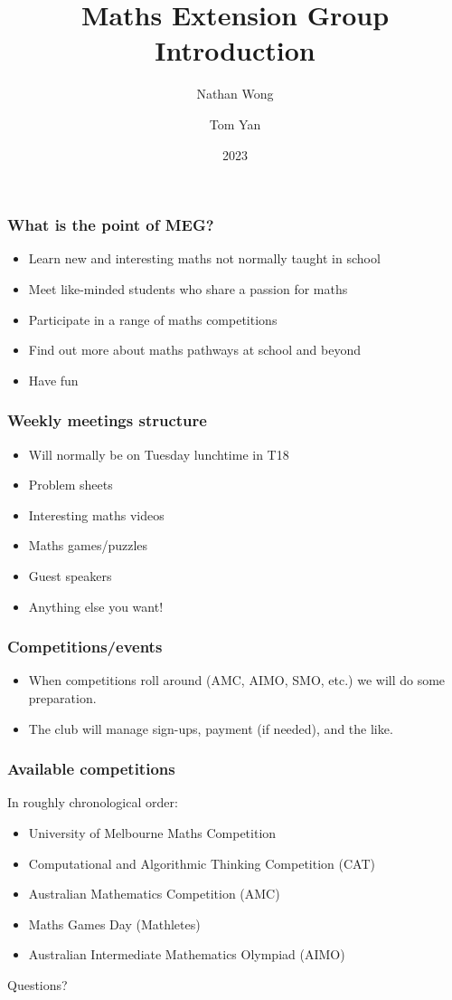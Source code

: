 \documentclass{beamer}
\title{Maths Extension Group Introduction}
\author{Nathan Wong \and Tom Yan}
\institute{Melbourne High School}
\date{2023}
\begin{document}
\frame{\titlepage}

\begin{frame}
  \frametitle{What is the point of MEG?}
  \pause
  \begin{itemize}
  \item Learn new and interesting maths not normally taught in school\pause
  \item Meet like-minded students who share a passion for maths\pause
  \item Participate in a range of maths competitions\pause
  \item Find out more about maths pathways at school and beyond\pause
  \item Have fun
  \end{itemize}
\end{frame}

\begin{frame}
  \frametitle{Weekly meetings structure}
  \pause
  \begin{itemize}
  \item Will normally be on Tuesday lunchtime in T18\pause
  \item Problem sheets \pause
  \item Interesting maths videos\pause
  \item Maths games/puzzles\pause
  \item Guest speakers\pause
  \item Anything else you want!
  \end{itemize}
\end{frame}

\begin{frame}
  \frametitle{Competitions/events}
  \pause
  \begin{itemize}
  \item When competitions roll around (AMC, AIMO, SMO, etc.) we will do some preparation.\pause
  \item The club will manage sign-ups, payment (if needed), and the like.
  \end{itemize}
\end{frame}

\begin{frame}
  \frametitle{Available competitions}
  In roughly chronological order:\pause
  \begin{itemize}
  \item University of Melbourne Maths Competition\pause
  \item Computational and Algorithmic Thinking Competition (CAT)\pause
  \item Australian Mathematics Competition (AMC)\pause
  \item Maths Games Day (Mathletes)\pause
  \item Australian Intermediate Mathematics Olympiad (AIMO)
  \end{itemize}
\end{frame}

\begin{frame}
\begin{centering}
\Huge
Questions?
\normalsize
\end{centering}
\end{frame}
\end{document}
